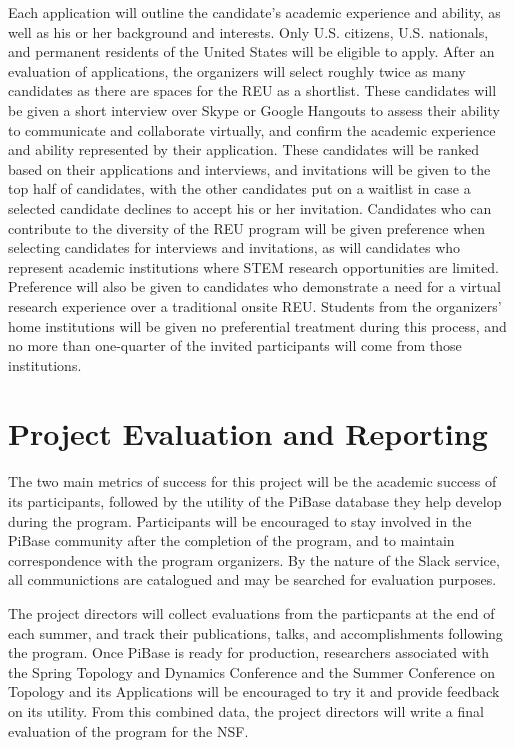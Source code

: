   Each application will outline the candidate's academic
  experience and ability, as well as his or her background and interests.
  Only U.S. citizens, U.S. nationals, and
  permanent residents of the United States will be eligible to apply.
  After an evaluation of applications, the organizers will select roughly twice
  as many candidates as there are spaces for the REU as a shortlist. These
  candidates will be given a short interview over Skype or Google Hangouts
  to assess their ability to communicate and collaborate virtually,
  and confirm the academic experience
  and ability represented by their application. These candidates will be
  ranked based on their applications and interviews, and invitations will
  be given to the top half of candidates, with the other candidates put
  on a waitlist in case a selected candidate declines to accept his or her
  invitation. Candidates who can contribute to the diversity of the
  REU program will be given preference when selecting candidates for
  interviews and invitations, as will candidates who represent academic
  institutions where STEM research opportunities are limited. Preference
  will also be given to candidates who demonstrate a need for a virtual
  research experience over a traditional onsite REU.
  Students from the organizers' home institutions
  will be given no preferential treatment during this process, and no more
  than one-quarter of the invited participants will come from those
  institutions.

\section{Project Evaluation and Reporting}

  The two main metrics of success for this project will be the academic success
  of its participants, followed by the utility of the PiBase database they help
  develop during the program. Participants will be encouraged to stay involved
  in the PiBase community after the completion of the program, and to maintain
  correspondence with the program organizers. By the nature of the Slack
  service, all communictions are catalogued and may be searched for
  evaluation purposes.

  The project directors will collect evaluations from the particpants at the end
  of each summer, and track their publications, talks, and
  accomplishments following the program. Once PiBase is ready for production,
  researchers associated with the Spring Topology and Dynamics Conference
  and the Summer Conference on Topology and its Applications
  will be encouraged to try it and provide feedback on its utility. From this
  combined data, the project directors will write a final evaluation of the
  program for the NSF.

